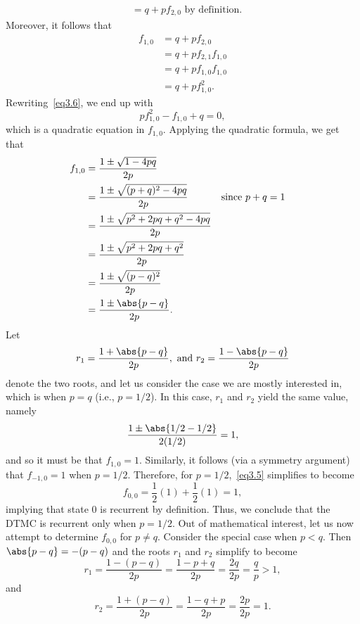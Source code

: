 \begin{Example}
\begin{align*}
         & =q+p f_{2,0}\text{ by definition}.
    \end{align*}
    Moreover, it follows that
    \begin{align*}
        f_{1,0}
         & =q+pf_{2,0}                             \\
         & =q+pf_{2,1}f_{1,0}                      \\
         & =q+pf_{1,0}f_{1,0}                      \\
         & =q+pf_{1,0}^2.\label{eq3.6}\tag*{(3.6)}
    \end{align*}
    Rewriting~\ref{eq3.6}, we end up with
    \[ pf_{1,0}^2-f_{1,0}+q=0, \]
    which is a quadratic equation in $ f_{1,0} $. Applying the quadratic formula,
    we get that
    \begin{align*}
        f_{1,0}
         & =\frac{1\pm \sqrt{1-4pq}}{2p}                                     \\
         & =\frac{1\pm \sqrt{(p+q)^2-4pq}}{2p}     &  & \text{since $p+q=1$} \\
         & =\frac{1\pm \sqrt{p^2+2pq+q^2-4pq}}{2p}                           \\
         & =\frac{1\pm \sqrt{p^2+2pq+q^2}}{2p}                               \\
         & =\frac{1\pm \sqrt{(p-q)^2}}{2p}                                   \\
         & =\frac{1\pm \abs{p-q}}{2p}.
    \end{align*}
    Let
    \[
        r_1=\frac{1+\abs{p-q}}{2p},\text{ and }r_2=\frac{1-\abs{p-q}}{2p}
    \]
    denote the two roots, and let us consider the case we are mostly
    interested in, which is when $p=q$ (i.e., $ p=1/2 $). In this case,
    $ r_1 $ and $ r_2 $ yield the same value, namely
    \[ \frac{1\pm \abs{1/2-1/2}}{2(1/2)}=1,  \]
    and so it must be that $ f_{1,0}=1 $. Similarly, it follows
    (via a symmetry argument) that $ f_{-1,0}=1 $ when $ p=1/2 $.
    Therefore, for $ p=1/2 $,~\ref{eq3.5} simplifies to become
    \[ f_{0,0}=\frac{1}{2}(1)+\frac{1}{2} (1)=1, \]
    implying that state $ 0 $ is recurrent by definition. Thus, we conclude
    that the DTMC is recurrent only when $ p=1/2 $. Out of mathematical interest,
    let us now attempt to determine $ f_{0,0} $ for $ p\ne q $. Consider the
    special case when $ p<q $. Then $ \abs{p-q}=-(p-q) $ and the roots
    $ r_1 $ and $ r_2 $ simplify to become
    \[ r_1=\frac{1-(p-q)}{2p}=\frac{1-p+q}{2p}=\frac{2q}{2p}=\frac{q}{p}>1,  \]
    and
    \[ r_2=\frac{1+(p-q)}{2p}=\frac{1-q+p}{2p}=\frac{2p}{2p}=1. \]

\end{Example}
